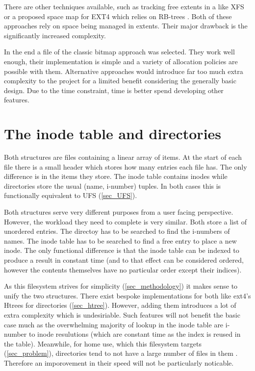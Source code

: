         There are other techniques available, such as tracking free extents in
        a \bplustree like XFS \cite{XFS_scalability} or a proposed space map
        for EXT4 which relies on RB-trees \cite{ext4_space_maps}. Both of these
        approaches rely on space being managed in extents. Their major drawback is
        the significantly increased complexity.

        In the end a file of the classic bitmap approach was selected. They
        work well enough, their implementation is simple and a variety of
        allocation policies are possible with them. Alternative approaches
        would introduce far too much extra complexity to the project for a
        limited benefit considering the generally basic design. Due to the time
        constraint, time is better spend developing other features.

    \section{The inode table and directories}

        Both structures are files containing a linear array of items. At the
        start of each file there is a small header which stores how many
        entries each file has. The only difference is in the items they store.
        The inode table contains inodes while directories store the usual
        (name, i-number) tuples. In both cases this is functionally equivalent
        to UFS (\ref{sec_UFS}).

        Both structures serve very different purposes from a user facing
        perspective. However, the workload they need to complete is very
        similar. Both store a list of unordered entries. The directoy has to be
        searched to find the i-numbers of names. The inode table has to be
        searched to find a free entry to place a new inode. The only functional
        difference is that the inode table can be indexed to produce a result
        in constant time (and to that effect can be considered ordered, however
        the contents themselves have no particular order except their indices).

        As this filesystem strives for simplicity (\ref{sec_methodology}) it
        makes sense to unify the two structures. There exist bespoke
        implementations for both like ext4's Htrees for directories
        (\ref{sec_htree}). However, adding them introduces a lot of extra
        complexity which is undesiriable. Such features will not benefit the
        basic case much as the overwhelming majority of lookup in the inode
        table are i-number to inode resulutions (which are constant time as the
        index is reused in the table). Meanwhile, for home use, which this
        filesystem targets (\ref{sec_problem}), directories tend to not have a
        large number of files in them \cite{contents_strudy}. Therefore an
        imporovement in their speed will not be particularly noticable.


